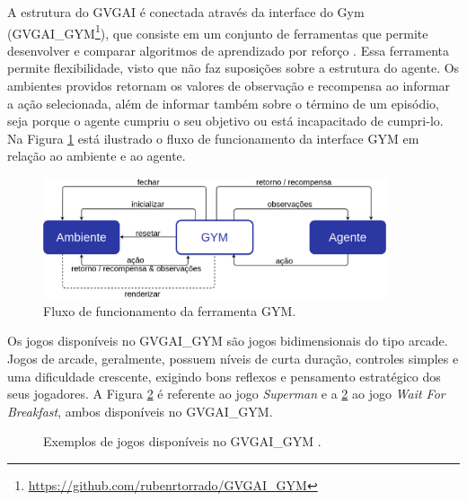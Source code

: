 A estrutura do GVGAI é conectada através da interface do Gym (GVGAI\_GYM\footnote{\url{https://github.com/rubenrtorrado/GVGAI\_GYM}}), que consiste em um conjunto de ferramentas que permite desenvolver e comparar algoritmos de aprendizado por reforço \cite{gymOpenai}. Essa ferramenta permite flexibilidade, visto que não faz suposições sobre a estrutura do agente. Os ambientes providos retornam os valores de observação e recompensa ao informar a ação selecionada, além de informar também sobre o término de um episódio, seja porque o agente cumpriu o seu objetivo ou está incapacitado de cumpri-lo. Na Figura \ref{fig:gym} está ilustrado o fluxo de funcionamento da interface GYM em relação ao ambiente e ao agente.

\begin{figure}[ht]
 \centering
  \includegraphics[width=0.9\textwidth]{./fig/gym}
 \caption{Fluxo de funcionamento da ferramenta GYM.}
 \label{fig:gym}
\end{figure}

Os jogos disponíveis no GVGAI\_GYM são jogos bidimensionais do tipo arcade. Jogos de arcade, geralmente, possuem níveis de curta duração, controles simples e uma dificuldade crescente, exigindo bons reflexos e pensamento estratégico dos seus jogadores. A Figura \ref{fig:jogosgvgai} é referente ao jogo \textit{Superman} e a \ref{fig:jogosgvgai} ao jogo \textit{Wait For Breakfast}, ambos disponíveis no GVGAI\_GYM.

\begin{figure}[ht]
  \centering
   \qquad
  \caption{Exemplos de jogos disponíveis no GVGAI\_GYM \cite{torrado18}.}
  \label{fig:jogosgvgai}
\end{figure}


